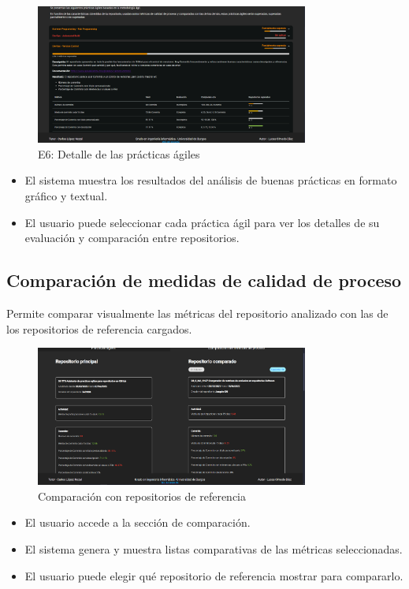 \begin{figure}[H]
\centering
\includegraphics[width=0.8\textwidth]{img/E6.1-detalle-practicas-agiles.png}
\caption{E6: Detalle de las prácticas ágiles}
\label{fig:E6.1-detalle-practicas-agiles}
\end{figure}

\begin{itemize}
    \item El sistema muestra los resultados del análisis de buenas prácticas en formato gráfico y textual.
    \item El usuario puede seleccionar cada práctica ágil para ver los detalles de su evaluación y comparación entre repositorios.
\end{itemize}

\newpage
\subsection{Comparación de medidas de calidad de proceso}

Permite comparar visualmente las métricas del repositorio analizado con las de los repositorios de referencia cargados.

\begin{figure}[H]
\centering
\includegraphics[width=0.8\textwidth]{img/E7-metricas.png}
\caption{Comparación con repositorios de referencia}
\label{fig:E7-metricas}
\end{figure}

\begin{itemize}
    \item El usuario accede a la sección de comparación.
    \item El sistema genera y muestra listas comparativas de las métricas seleccionadas.
    \item El usuario puede elegir qué repositorio de referencia mostrar para compararlo.
\end{itemize}
